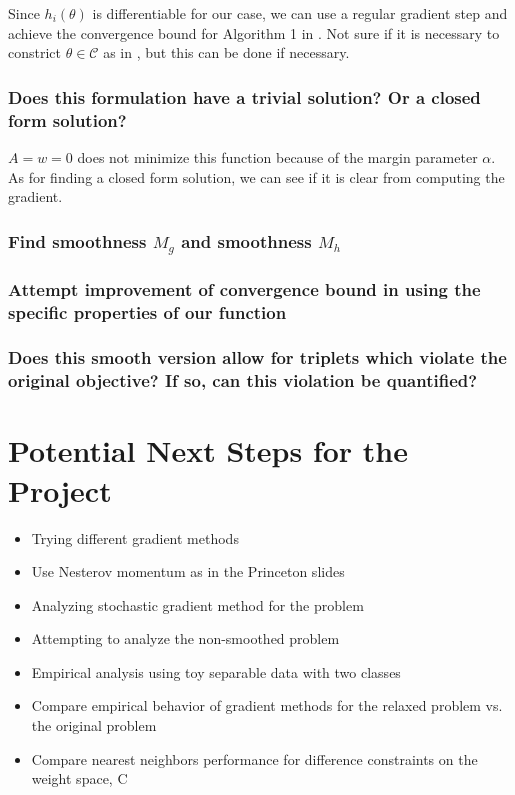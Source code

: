 \documentclass[11pt]{article}
\begin{document}
Since $h_i(\theta)$ is differentiable for our case, we can use a regular gradient step and achieve the convergence bound for Algorithm 1 in \cite{khamaru_convergence_2018}. Not sure if it is necessary to constrict $\theta \in \mathcal{C}$ as in \cite{khamaru_convergence_2018}, but this can be done if necessary.

\subsubsection{Does this formulation have a trivial solution? Or a closed form solution?}

$A = w = 0$ does not minimize this function because of the margin parameter $\alpha$. As for finding a closed form solution, we can see if it is clear from computing the gradient.

\subsubsection{Find smoothness $M_g$ and smoothness $M_h$}

\subsubsection{Attempt improvement of convergence bound in \cite{khamaru_convergence_2018} using the specific properties of our function}

\subsubsection{Does this smooth version allow for triplets which violate the original objective? If so, can this violation be quantified?}

\section{Potential Next Steps for the Project}

\begin{itemize}
  \item Trying different gradient methods
  \item Use Nesterov momentum as in the Princeton slides
  \item Analyzing stochastic gradient method for the problem
  \item Attempting to analyze the non-smoothed problem
  \item Empirical analysis using toy separable data with two classes
  \item Compare empirical behavior of gradient methods for the relaxed problem vs. the original problem
  \item Compare nearest neighbors performance for difference constraints on the weight space, C
\end{itemize}


\end{document}
